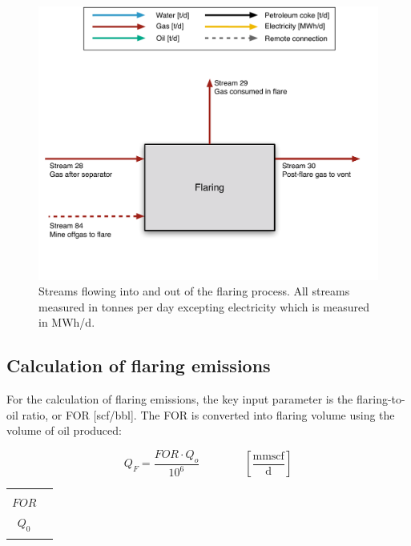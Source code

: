 \documentclass[11pt]{report}
\newcommand{\xlname}[1]{\raisebox{1pt}{\fcolorbox{light-gray}{light-gray}{\texttt{\textcolor{stanford}{\scriptsize{#1}}}}}}
\newcommand{\eqnunitfrac}[2]{\quad\quad \scriptstyle{\left[\frac{\text{#1}}{\text{#2}}\right]}}
\begin{document}
\begin{figure}
\includegraphics[width=0.85\columnwidth]{images/flaring_PF.pdf}
\caption{Streams flowing into and out of the flaring process. All streams measured in tonnes per day excepting electricity which is measured in MWh/d.}
\label{fig:flaring_PF}
\end{figure}



\subsection{Calculation of flaring emissions} \label{sec:flaring_emissions}


For the calculation of flaring emissions, the key input parameter is the flaring-to-oil ratio, or FOR [scf/bbl]. The FOR is converted into flaring volume using the volume of oil produced:

\begin{minipage}{0.6\columnwidth}
\begin{fleqn}[0pt]
\begin{equation} \label{eq:flaring_volume}
Q_{F}= \frac{FOR \cdot Q_{o}}{10^6} \quad\quad\eqnunitfrac{mmscf}{d}
\end{equation}
\end{fleqn}
\end{minipage}\hfill
\begin{minipage}{0.3\columnwidth}
        \begin{tabular}{|cl}
                        & \\
        $FOR$       & \xlname{FOR}\\
        $Q_0$       & \xlname{Oil\_prod}\\
        & \\
        \end{tabular}
\end{minipage}
\end{document}
